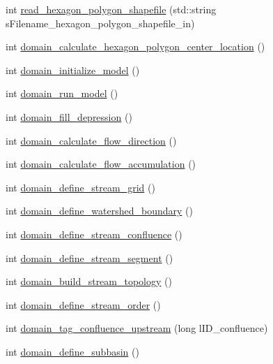 \begin{DoxyCompactItemize}
\item 
int \hyperlink{classhexwatershed_1_1domain_a0398863e0789867ff4c241c762e2556c}{read\-\_\-hexagon\-\_\-polygon\-\_\-shapefile} (std\-::string s\-Filename\-\_\-hexagon\-\_\-polygon\-\_\-shapefile\-\_\-in)
\item 
int \hyperlink{classhexwatershed_1_1domain_afca38447e56be20f7a6d2853fe7251bb}{domain\-\_\-calculate\-\_\-hexagon\-\_\-polygon\-\_\-center\-\_\-location} ()
\item 
int \hyperlink{classhexwatershed_1_1domain_a027b4dc68624df0ea9b479902fa37ec7}{domain\-\_\-initialize\-\_\-model} ()
\item 
int \hyperlink{classhexwatershed_1_1domain_a77dc83d7a361f08669141a6d30d2d9e6}{domain\-\_\-run\-\_\-model} ()
\item 
int \hyperlink{classhexwatershed_1_1domain_ac9e6620a2104e5852af9d420b206fea1}{domain\-\_\-fill\-\_\-depression} ()
\item 
int \hyperlink{classhexwatershed_1_1domain_a0deb61a5834c6dc73ea5257f9da4fed9}{domain\-\_\-calculate\-\_\-flow\-\_\-direction} ()
\item 
int \hyperlink{classhexwatershed_1_1domain_ae42abc180d3ee0b13b10389be5bc1719}{domain\-\_\-calculate\-\_\-flow\-\_\-accumulation} ()
\item 
int \hyperlink{classhexwatershed_1_1domain_a204f9552b66b2f2c94c32b50a99324eb}{domain\-\_\-define\-\_\-stream\-\_\-grid} ()
\item 
int \hyperlink{classhexwatershed_1_1domain_a1c8425f7efe360857994d6a70d080c97}{domain\-\_\-define\-\_\-watershed\-\_\-boundary} ()
\item 
int \hyperlink{classhexwatershed_1_1domain_af745bbbe6eff842e26996f43607fd36b}{domain\-\_\-define\-\_\-stream\-\_\-confluence} ()
\item 
int \hyperlink{classhexwatershed_1_1domain_a5aa4c948b2e6af271b961184522a114d}{domain\-\_\-define\-\_\-stream\-\_\-segment} ()
\item 
int \hyperlink{classhexwatershed_1_1domain_ad2b11812ce5315cdf3e7442a15c7fbaf}{domain\-\_\-build\-\_\-stream\-\_\-topology} ()
\item 
int \hyperlink{classhexwatershed_1_1domain_aaf3528852f5431fb674b94c6ce39dd5f}{domain\-\_\-define\-\_\-stream\-\_\-order} ()
\item 
int \hyperlink{classhexwatershed_1_1domain_a75316b0c2fea060db74db70c76d61711}{domain\-\_\-tag\-\_\-confluence\-\_\-upstream} (long l\-I\-D\-\_\-confluence)
\item 
int \hyperlink{classhexwatershed_1_1domain_afe910ab221c8e6871ae7e1d67e8788e1}{domain\-\_\-define\-\_\-subbasin} ()

\end{DoxyCompactItemize}
